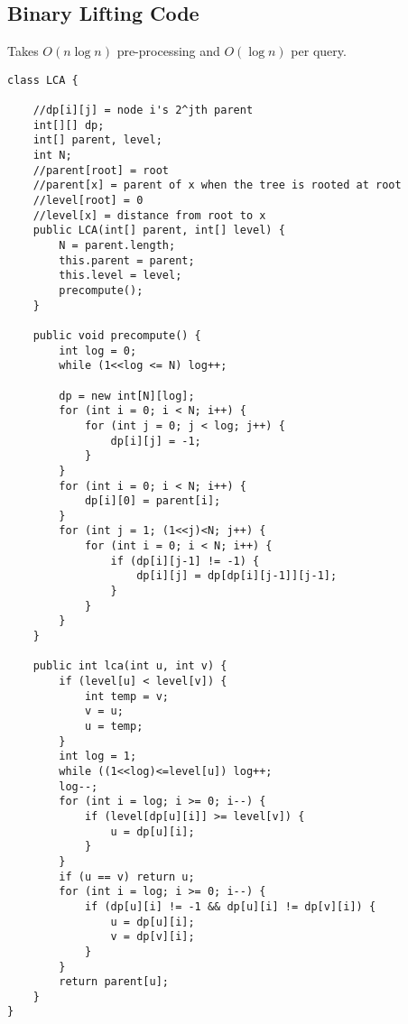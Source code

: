 \documentclass[11pt]{article}
\theoremstyle{plain}
\theoremstyle{definition}
\begin{document}
\subsection*{Binary Lifting Code}
Takes $O(n \log n)$ pre-processing and $O(\log n)$ per query.
\begin{lstlisting}
class LCA {
	
	//dp[i][j] = node i's 2^jth parent
	int[][] dp;
	int[] parent, level;
	int N;
	//parent[root] = root
	//parent[x] = parent of x when the tree is rooted at root
	//level[root] = 0
	//level[x] = distance from root to x
	public LCA(int[] parent, int[] level) {
		N = parent.length;
		this.parent = parent;
		this.level = level;
		precompute();
	}
	
	public void precompute() {
		int log = 0;
		while (1<<log <= N) log++;

		dp = new int[N][log];
		for (int i = 0; i < N; i++) {
			for (int j = 0; j < log; j++) {
				dp[i][j] = -1;
			}
		}
		for (int i = 0; i < N; i++) {
			dp[i][0] = parent[i];
		}
		for (int j = 1; (1<<j)<N; j++) {
			for (int i = 0; i < N; i++) {
				if (dp[i][j-1] != -1) {
					dp[i][j] = dp[dp[i][j-1]][j-1];
				}	
			}
		}
	}

	public int lca(int u, int v) {
		if (level[u] < level[v]) {
			int temp = v;
			v = u;
			u = temp;
		}
		int log = 1;
		while ((1<<log)<=level[u]) log++;
		log--;
		for (int i = log; i >= 0; i--) {
			if (level[dp[u][i]] >= level[v]) {
				u = dp[u][i];
			}
		}
		if (u == v) return u;
		for (int i = log; i >= 0; i--) {
			if (dp[u][i] != -1 && dp[u][i] != dp[v][i]) {
				u = dp[u][i];
				v = dp[v][i];
			}
		}
		return parent[u];
	}
}
\end{lstlisting}
\end{document}
